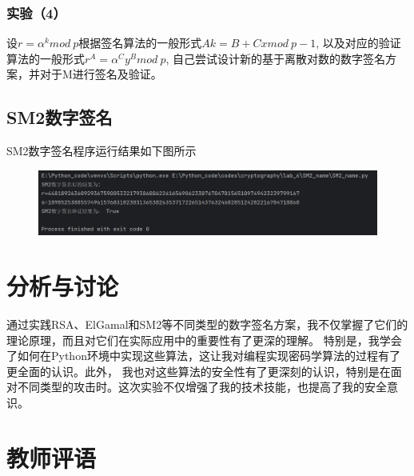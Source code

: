 \documentclass[a4paper,11pt,UTF8]{ctexart}
\newcommand{\bottomcaption}{%
\setlength{\abovecaptionskip}{6pt}%
\setlength{\belowcaptionskip}{6pt}%
\caption}
\newcommand{\xiaowuhao}{\fontsize{9pt}{\baselineskip}\selectfont}   %
\begin{document}
    \subsubsection{实验（4）}
      设$r=\alpha ^{k}mod\ p$根据签名算法的一般形式$Ak=B+Cxmod\ p-1$,
      以及对应的验证算法的一般形式$r^{A}=\alpha ^{C}y^{B}mod\ p$,
      自己尝试设计新的基于离散对数的数字签名方案，并对于M进行签名及验证。

  \subsection{SM2数字签名}
      SM2数字签名程序运行结果如下图所示
      \begin{figure}[H]
        \centering
        \includegraphics[width=13cm]{SM2_result.png}
        \bottomcaption{\xiaowuhao{SM2运算结果}}
      \end{figure}

\section{分析与讨论}
  通过实践RSA、ElGamal和SM2等不同类型的数字签名方案，我不仅掌握了它们的理论原理，而且对它们在实际应用中的重要性有了更深的理解。
  特别是，我学会了如何在Python环境中实现这些算法，这让我对编程实现密码学算法的过程有了更全面的认识。此外，
  我也对这些算法的安全性有了更深刻的认识，特别是在面对不同类型的攻击时。这次实验不仅增强了我的技术技能，也提高了我的安全意识。


\section{教师评语}
\end{document}

